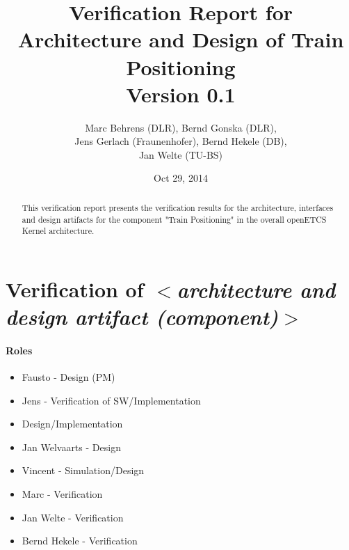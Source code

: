 \documentclass{article}
\title{Verification Report for Architecture and Design of Train Positioning \\Version 0.1}
\author{Marc Behrens (DLR), Bernd Gonska (DLR),\\ Jens Gerlach (Fraunenhofer), Bernd Hekele (DB),\\ Jan Welte (TU-BS)}
\date{Oct 29, 2014}
\newcommand{\tbi}[1]{$<$\textit{#1}$>$}
\begin{document}
\maketitle

\begin{abstract}

This verification report presents the verification results for the architecture, interfaces and design artifacts for the component "Train Positioning" in the overall openETCS Kernel architecture.

\begin{comment}
This template provides the required content to complete the verification of architecture and design artifacts.
To close the development phase for this artifact all required information shall be given, even if it can only be stated that specific aspects are missing in the artifact due to open points in related artifacts. 

The template should be used as a guideline to check whether all
information is given appropriately. The wording used in this proposal
is by no means mandatory. And if you feel that more information is
useful to describe your activity within the context of openETCS, you
should of course do so. Feel free to add additional categories of
description as adequate. 

Also the \LaTeX{} macros may be changed, though the use of
\texttt{paragraph} and \texttt{subparagraph} enables easy integration
into higher-level documents (they are not numbered automatically,
which may be a drawback in other respects). 
\end{comment}
\end{abstract}

\section{Verification of \tbi{architecture and design artifact (component)}}

\paragraph{Roles}

\begin{itemize}
\item Fausto - Design (PM)
\item Jens - Verification of SW/Implementation
\item Design/Implementation
\item Jan Welvaarts - Design
\item Vincent - Simulation/Design
\item Marc - Verification
\item Jan Welte - Verification
\item Bernd Hekele - Verification
\end{itemize}
\end{document}
